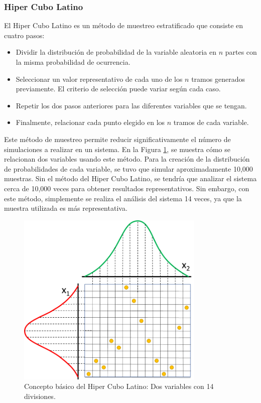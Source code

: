 \subsubsection{Hiper Cubo Latino}
El Hiper Cubo Latino es un método de muestreo estratificado que consiste en cuatro pasos:
\begin{itemize}
    \item Dividir la distribución de probabilidad de la variable aleatoria en \(n\) partes con la misma probabilidad de ocurrencia.
    \item Seleccionar un valor representativo de cada uno de los \(n\) tramos generados previamente. El criterio de selección puede variar según cada caso.
    \item Repetir los dos pasos anteriores para las diferentes variables que se tengan.
    \item Finalmente, relacionar cada punto elegido en los \(n\) tramos de cada variable.
\end{itemize}

Este método de muestreo permite reducir significativamente el número de simulaciones a realizar en un sistema. En la Figura \ref{fig:latin_hypercube}, se muestra cómo se relacionan dos variables usando este método. Para la creación de la distribución de probabilidades de cada variable, se tuvo que simular aproximadamente 10,000 muestras. Sin el método del Hiper Cubo Latino, se tendría que analizar el sistema cerca de 10,000 veces para obtener resultados representativos. Sin embargo, con este método, simplemente se realiza el análisis del sistema 14 veces, ya que la muestra utilizada es más representativa.

\begin{figure}[H]
    \centering
    \includegraphics[width=0.8\textwidth]{Imagenes/figure2.png} %
    \caption{Concepto básico del Hiper Cubo Latino: Dos variables con 14 divisiones.}
    \label{fig:latin_hypercube}
\end{figure}

